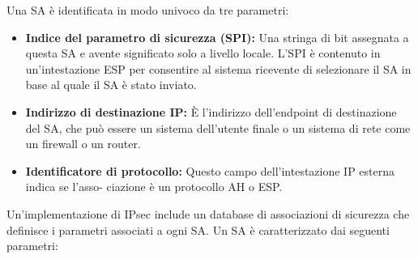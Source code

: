 \singlespacing

Una SA è identificata in modo univoco da tre parametri:

\begin{itemize}
    \item \textbf{Indice del parametro di sicurezza (SPI):} Una stringa di bit assegnata a questa SA e avente significato solo a livello locale. L'SPI è contenuto in un'intestazione ESP per consentire al sistema ricevente di selezionare il SA in base al quale il SA è stato inviato.
    
    \item \textbf{Indirizzo di destinazione IP:} È l'indirizzo dell'endpoint di destinazione del SA, che può essere un sistema dell'utente finale o un sistema di rete come un firewall o un router.
    
    \item \textbf{Identificatore di protocollo:} Questo campo dell'intestazione IP esterna indica se l'asso- ciazione è un protocollo AH o ESP.
\end{itemize}
Un'implementazione di IPsec include un database di associazioni di sicurezza che definisce i parametri associati a ogni SA. Un SA è caratterizzato dai seguenti parametri:

